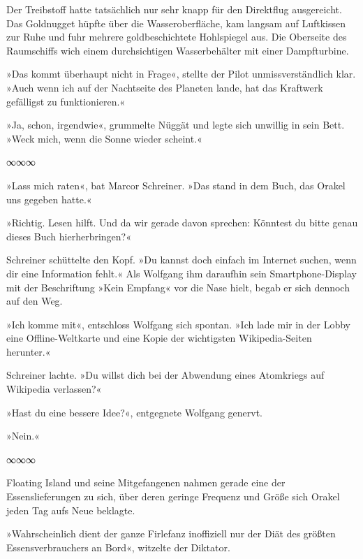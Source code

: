 Der Treibstoff hatte tatsächlich nur sehr knapp für den Direktflug ausgereicht. Das Goldnugget hüpfte über die Wasseroberfläche, kam langsam auf Luftkissen zur Ruhe und fuhr mehrere goldbeschichtete Hohlspiegel aus. Die Oberseite des Raumschiffs wich einem durchsichtigen Wasserbehälter mit einer Dampfturbine.


»Das kommt überhaupt nicht in Frage«, stellte der Pilot unmissverständlich klar. »Auch wenn ich auf der Nachtseite des Planeten lande, hat das Kraftwerk gefälligst zu funktionieren.«


»Ja, schon, irgendwie«, grummelte Nüggät und legte sich unwillig in sein Bett. »Weck mich, wenn die Sonne wieder scheint.«

\begin{center}
∞∞∞
\end{center}

»Lass mich raten«, bat Marcor Schreiner. »Das stand in dem Buch, das Orakel uns gegeben hatte.«

»Richtig. Lesen hilft. Und da wir gerade davon sprechen: Könntest du bitte genau dieses Buch hierherbringen?«

Schreiner schüttelte den Kopf. »Du kannst doch einfach im Internet suchen, wenn dir eine Information fehlt.« Als Wolfgang ihm daraufhin sein Smartphone-Display mit der Beschriftung »Kein Empfang« vor die Nase hielt, begab er sich dennoch auf den Weg.

»Ich komme mit«, entschloss Wolfgang sich spontan. »Ich lade mir in der Lobby eine Offline-Weltkarte und eine Kopie der wichtigsten Wikipedia-Seiten herunter.«

Schreiner lachte. »Du willst dich bei der Abwendung eines Atomkriegs auf Wikipedia verlassen?«

»Hast du eine bessere Idee?«, entgegnete Wolfgang genervt.

»Nein.«

\begin{center}
∞∞∞
\end{center}

Floating Island und seine Mitgefangenen nahmen gerade eine der Essenslieferungen zu sich, über deren geringe Frequenz und Größe sich Orakel jeden Tag aufs Neue beklagte.

»Wahrscheinlich dient der ganze Firlefanz inoffiziell nur der Diät des größten Essensverbrauchers an Bord«, witzelte der Diktator.

